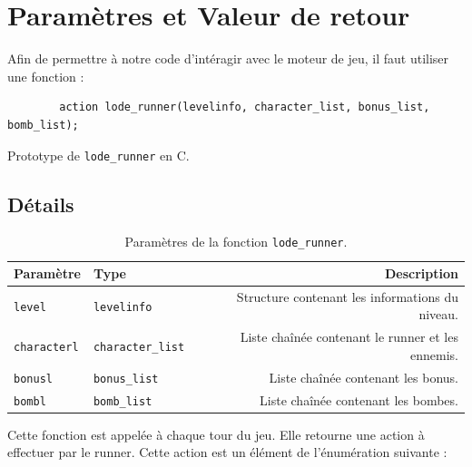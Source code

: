 \chapter{Paramètres et Valeur de retour}
\label{chap:Parametres}

Afin de permettre à notre code d'intéragir avec le moteur de jeu, il faut utiliser une fonction :

\begin{listing}[!htpb]
    \begin{verbatim}
        action lode_runner(levelinfo, character_list, bonus_list, bomb_list);
    \end{verbatim}
    \caption{Prototype de \texttt{lode\_runner} en C.}
    \label{listing:c-lode_runner-prototype-1}
\end{listing}

\section{Détails}

\begin{table}[!htpb]
    \label{tab:parameters-lode_runner-1}
    \begin{tabularx}{\textwidth}{lXr}
        \toprule
        \textbf{Paramètre} & \textbf{Type} & \textbf{Description} \\
        \midrule
        \texttt{level} & \texttt{levelinfo} & Structure contenant les informations du niveau. \\
        \texttt{characterl} & \texttt{character\_list} & Liste chaînée contenant le runner et les ennemis. \\
        \texttt{bonusl} & \texttt{bonus\_list} & Liste chaînée contenant les bonus. \\
        \texttt{bombl} & \texttt{bomb\_list} & Liste chaînée contenant les bombes. \\
        \bottomrule
    \end{tabularx}
    \caption{Paramètres de la fonction \texttt{lode\_runner}.}
\end{table}

Cette fonction est appelée à chaque tour du jeu. Elle retourne une action à effectuer par le runner.
Cette action est un élément de l'énumération suivante :

